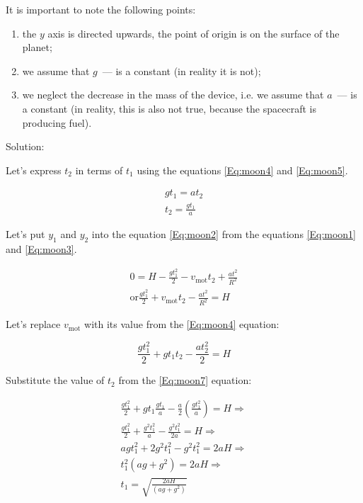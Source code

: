 \documentclass[12pt,a4paper]{article}
\begin{document}
It is important to note the following points:

\begin{enumerate}
\item the $y$ axis is directed upwards, the point of origin is on the surface of the planet;
\item we assume that $g$~--- is a constant (in reality it is not);
\item we neglect the decrease in the mass of the device, i.e. we assume that $a$~--- is a constant (in reality, this is also not true, because the spacecraft is producing fuel).
\end{enumerate}

Solution:

Let's express $t_2$ in terms of $t_1$ using the equations \ref{Eq:moon4} and \ref{Eq:moon5}.

\begin{eqnarray}
  g t_1 = a t_2 \nonumber \\
  t_2 = \frac{g t_1}{a} \label{Eq:moon7}
\end{eqnarray}

Let's put $y_1$ and $y_2$ into the equation \ref{Eq:moon2} from the equations \ref{Eq:moon1} and \ref{Eq:moon3}.

$$
\begin{array}{c}
  0 = H - \frac{g t^2_1}{2} - v_{\text{mot}}t_2 + \frac{a t^2}{R^2}\\
  \text{or} \frac{g t^2_1}{2} + v_{\text{mot}}t_2 - \frac{a t^2}{R^2} = H
\end{array}
$$

Let's replace $v_{\text{mot}}$ with its value from the \ref{Eq:moon4} equation:

$$
\frac{g t_1^2}{2} + g t_1 t_2 - \frac{a t_2^2}{2} = H
$$

Substitute the value of $t_2$ from the \ref{Eq:moon7} equation:

$$
\begin{array}{c}
  \frac{g t_1^2}{2} + g t_1 \frac{g t_1}{a} - \frac{a}{2} \left(\frac{g t_1^2}{a}\right) =
  H \Rightarrow \\
  \frac{g t_1^2}{2} + \frac{g^2 t_1^2}{a} - \frac{g^2 t_1^2}{2 a} = H \Rightarrow \\
  a g t_1^2 + 2 g^2 t_1^2 - g^2 t_1^2 = 2 a H \Rightarrow \\
  t_1^2 \left(ag + g^2\right) = 2aH \Rightarrow \\
  t_1 = \sqrt{\frac{2 a H}{\left(a g + g^2\right)}}
\end{array}
$$
\end{document}
